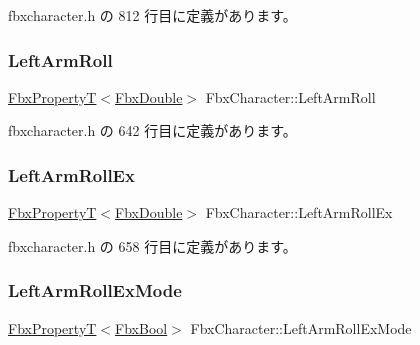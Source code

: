  fbxcharacter.\+h の 812 行目に定義があります。

\mbox{\label{class_fbx_character_a7faee1f8cc844f30b5b4cca5fc3782d7}} 
\subsubsection{\texorpdfstring{Left\+Arm\+Roll}{LeftArmRoll}}
{\footnotesize\ttfamily \hyperlink{class_fbx_property_t}{Fbx\+PropertyT}$<$\hyperlink{fbxtypes_8h_a171e72a1c46fc15c1a6c9c31948c1c5b}{Fbx\+Double}$>$ Fbx\+Character\+::\+Left\+Arm\+Roll}



 fbxcharacter.\+h の 642 行目に定義があります。

\mbox{\label{class_fbx_character_a0ba6477859cfe4d8cf40ad25d0ad77f9}} 
\subsubsection{\texorpdfstring{Left\+Arm\+Roll\+Ex}{LeftArmRollEx}}
{\footnotesize\ttfamily \hyperlink{class_fbx_property_t}{Fbx\+PropertyT}$<$\hyperlink{fbxtypes_8h_a171e72a1c46fc15c1a6c9c31948c1c5b}{Fbx\+Double}$>$ Fbx\+Character\+::\+Left\+Arm\+Roll\+Ex}



 fbxcharacter.\+h の 658 行目に定義があります。

\mbox{\label{class_fbx_character_a0179aa02e908bbddb1c8c3d2af572e7e}} 
\subsubsection{\texorpdfstring{Left\+Arm\+Roll\+Ex\+Mode}{LeftArmRollExMode}}
{\footnotesize\ttfamily \hyperlink{class_fbx_property_t}{Fbx\+PropertyT}$<$\hyperlink{fbxtypes_8h_a92e0562b2fe33e76a242f498b362262e}{Fbx\+Bool}$>$ Fbx\+Character\+::\+Left\+Arm\+Roll\+Ex\+Mode}



